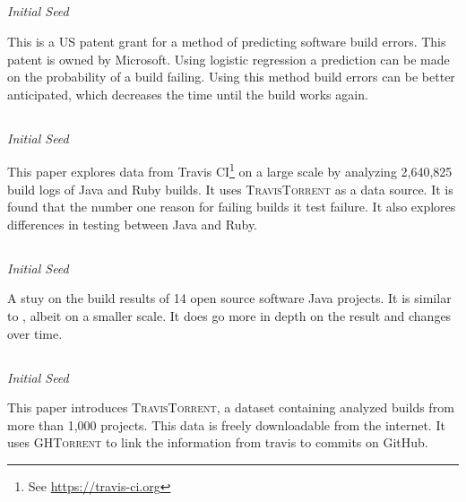 \documentclass[]{book}
\let\rmarkdownfootnote\footnote%
\def\footnote{\protect\rmarkdownfootnote}
\begin{document}
\subsection{\texorpdfstring{\citet{bird2017predicting}}{@bird2017predicting}}\label{bird2017predicting}

\emph{Initial Seed}

This is a US patent grant for a method of predicting software build
errors. This patent is owned by Microsoft. Using logistic regression a
prediction can be made on the probability of a build failing. Using this
method build errors can be better anticipated, which decreases the time
until the build works again.

\subsection{\texorpdfstring{\citet{beller2017oops}}{@beller2017oops}}\label{beller2017oops}

\emph{Initial Seed}

This paper explores data from Travis CI\footnote{See
  \url{https://travis-ci.org}} on a large scale by analyzing 2,640,825
build logs of Java and Ruby builds. It uses \textsc{TravisTorrent} as a
data source. It is found that the number one reason for failing builds
it test failure. It also explores differences in testing between Java
and Ruby.

\subsection{\texorpdfstring{\citet{rausch2017empirical}}{@rausch2017empirical}}\label{rausch2017empirical}

\emph{Initial Seed}

A stuy on the build results of 14 open source software Java projects. It
is similar to \citet{beller2017oops}, albeit on a smaller scale. It does
go more in depth on the result and changes over time.

\subsection{\texorpdfstring{\citet{beller2017travistorrent}}{@beller2017travistorrent}}\label{beller2017travistorrent}

\emph{Initial Seed}

This paper introduces \textsc{TravisTorrent}, a dataset containing
analyzed builds from more than 1,000 projects. This data is freely
downloadable from the internet. It uses \textsc{GHTorrent} to link the
information from travis to commits on GitHub.
\end{document}
